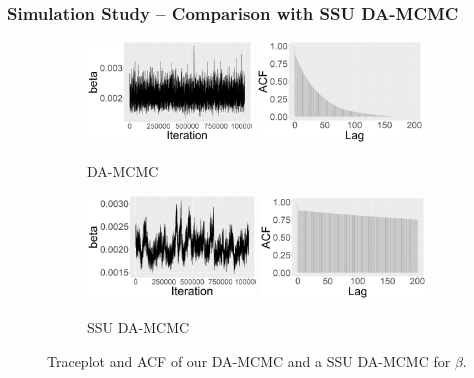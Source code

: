\documentclass{beamer}
\begin{document}
\begin{frame} \frametitle{Simulation Study --  Comparison with SSU DA-MCMC}  
	
	\begin{figure}
		\centering
		\begin{subfigure}[b]{0.49\textwidth}
			\centering
			\includegraphics[width=0.48\textwidth]{E6_no_burn_beta_tp_joint.jpg}
			\includegraphics[width=0.48\textwidth]{E6_burn_beta_acf_joint.jpg}
			\caption{DA-MCMC}
			\label{fig:E6_no_burn_beta_tp_joint}
		\end{subfigure}
		\hfill
		\begin{subfigure}[b]{0.49\textwidth}
			\centering
			\includegraphics[width=0.49\textwidth]{E6_no_burn_beta_tp_single.jpg}
			\includegraphics[width=0.48\textwidth]{E6_burn_beta_acf_single.jpg}
			\caption{SSU DA-MCMC}
			\label{fig:E6_no_burn_beta_tp_single}
		\end{subfigure}
		\caption{Traceplot and ACF of our DA-MCMC and a SSU DA-MCMC for $\beta$.}
		\label{fig:E6}
	\end{figure}
	

\end{frame}
\end{document}
